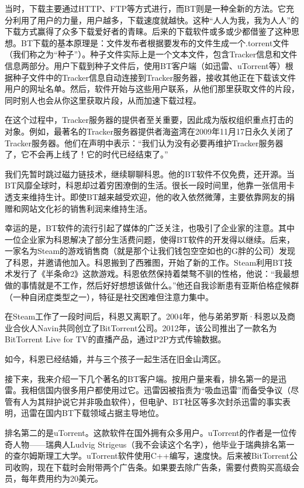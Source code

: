\documentclass[
  letterpaper,
  DIV=11,
  numbers=noendperiod]{scrreprt}
\begin{document}
当时，下载主要通过HTTP、FTP等方式进行，而BT则是一种全新的方法。它充分利用了用户的力量，用户越多，下载速度就越快。这种``人人为我，我为人人''的下载方式赢得了众多下载爱好者的青睐。后来的下载软件或多或少都借鉴了这种思想。BT下载的基本原理是：文件发布者根据要发布的文件生成一个.torrent文件（我们称之为``种子''）。种子文件实际上是一个文本文件，包含Tracker信息和文件信息两部分。用户下载到种子文件后，使用BT客户端（如迅雷、uTorrent等）根据种子文件中的Tracker信息自动连接到Tracker服务器，接收其他正在下载该文件用户的网址名单。然后，软件开始与这些用户联系，从他们那里获取文件的片段，同时别人也会从你这里获取片段，从而加速下载过程。

在这个过程中，Tracker服务器的提供者至关重要，因此成为版权组织重点打击的对象。例如，最著名的Tracker服务器提供者海盗湾在2009年11月17日永久关闭了Tracker服务器。他们在声明中表示：``我们认为没有必要再维护Tracker服务器了，它不会再上线了！它的时代已经结束了。''

我们先暂时跳过磁力链技术，继续聊聊科恩。他的BT软件不仅免费，还开源。当BT风靡全球时，科恩却过着穷困潦倒的生活。很长一段时间里，他靠一张信用卡透支来维持生计。即使BT越来越受欢迎，他的收入依然微薄，主要依靠网友的捐赠和网站文化衫的销售利润来维持生活。

幸运的是，BT软件的流行引起了媒体的广泛关注，也吸引了企业家的注意。其中一位企业家为科恩解决了部分生活费问题，使得BT软件的开发得以继续。后来，一家名为Steam的游戏销售商（就是那个让我们钱包空空如也的G胖的公司）发现了科恩，并邀请他加入。科恩搬到了西雅图，开始了新的工作。Steam利用BT技术发行了《半条命2》这款游戏。科恩依然保持着桀骜不驯的性格，他说：``我最想做的事情就是不工作，然后好好想想该做什么。''他还自我诊断患有亚斯伯格症候群（一种自闭症类型之一），特征是社交困难但注意力集中。

在Steam工作了一段时间后，科恩又离职了。2004年，他与弟弟罗斯·科恩以及商业合伙人Navin共同创立了BitTorrent公司。2012年，该公司推出了一款名为BitTorrent
Live for TV的直播产品，通过P2P方式传输数据。

如今，科恩已经结婚，并与三个孩子一起生活在旧金山湾区。

接下来，我来介绍一下几个著名的BT客户端。按用户量来看，排名第一的是迅雷。我相信国内很多用户都使用过它。迅雷因被指责为``吸血迅雷''而备受争议（尽管有人为其辩护说它并非吸血软件），但电驴、BT社区等多次封杀迅雷的事实表明，迅雷在国内BT下载领域占据主导地位。

排名第二的是uTorrent。这款软件在国外拥有众多用户。uTorrent的作者是一位传奇人物------瑞典人Ludvig
Strigeus（我不会读这个名字），他毕业于瑞典排名第一的查尔姆斯理工大学。uTorrent软件使用C++编写，速度快。后来被BitTorrent公司收购，现在下载时会附带两个广告条。如果要去除广告条，需要付费购买高级会员，每年费用约为20美元。
\end{document}

